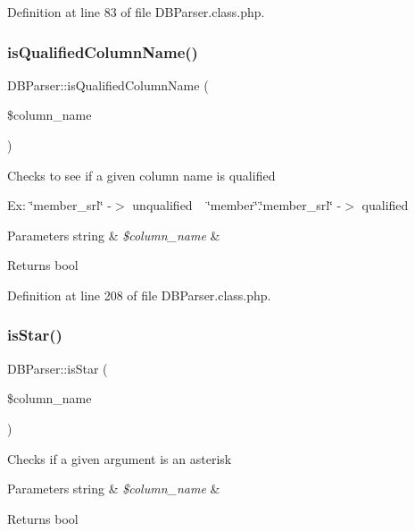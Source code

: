 Definition at line 83 of file D\+B\+Parser.\+class.\+php.

\hypertarget{classDBParser_a927c668f7d1b2994743f9bdf6530ba58}{}\label{classDBParser_a927c668f7d1b2994743f9bdf6530ba58} 
\subsubsection{\texorpdfstring{is\+Qualified\+Column\+Name()}{isQualifiedColumnName()}}
{\footnotesize\ttfamily D\+B\+Parser\+::is\+Qualified\+Column\+Name (\begin{DoxyParamCaption}\item[{}]{\$column\+\_\+name }\end{DoxyParamCaption})}

Checks to see if a given column name is qualified

Ex\+: \char`\"{}member\+\_\+srl\char`\"{} -\/$>$ unqualified ~\newline
 \char`\"{}member\char`\"{}.\char`\"{}member\+\_\+srl\char`\"{} -\/$>$ qualified


\begin{DoxyParams}[1]{Parameters}
string & {\em \$column\+\_\+name} & \\
\hline
\end{DoxyParams}
\begin{DoxyReturn}{Returns}
bool 
\end{DoxyReturn}


Definition at line 208 of file D\+B\+Parser.\+class.\+php.

\hypertarget{classDBParser_a73f99ee88bbe7c6bc871a67de4efa2b1}{}\label{classDBParser_a73f99ee88bbe7c6bc871a67de4efa2b1} 
\subsubsection{\texorpdfstring{is\+Star()}{isStar()}}
{\footnotesize\ttfamily D\+B\+Parser\+::is\+Star (\begin{DoxyParamCaption}\item[{}]{\$column\+\_\+name }\end{DoxyParamCaption})}

Checks if a given argument is an asterisk


\begin{DoxyParams}[1]{Parameters}
string & {\em \$column\+\_\+name} & \\
\hline
\end{DoxyParams}
\begin{DoxyReturn}{Returns}
bool 
\end{DoxyReturn}


